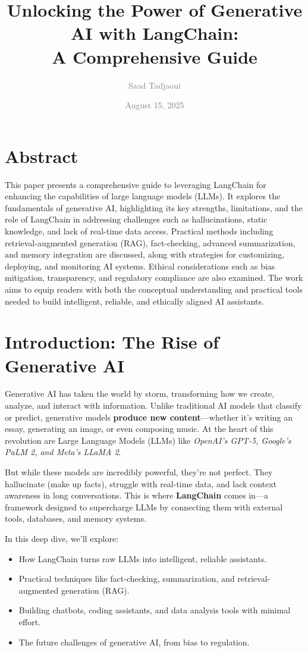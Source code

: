 \documentclass[12pt,a4paper]{article}
\title{\textcolor{mainblue}{\textbf{Unlocking the Power of Generative AI with LangChain: \\ A Comprehensive Guide}}}
\author{\textcolor{graytext}{Saad Tadjaoui}}
\date{\textcolor{graytext}{August 15, 2025}}
\begin{document}
\maketitle

\section*{Abstract}
\color{graytext}
This paper presents a comprehensive guide to leveraging LangChain for enhancing the capabilities of large language models (LLMs). It explores the fundamentals of generative AI, highlighting its key strengths, limitations, and the role of LangChain in addressing challenges such as hallucinations, static knowledge, and lack of real-time data access. Practical methods including retrieval-augmented generation (RAG), fact-checking, advanced summarization, and memory integration are discussed, along with strategies for customizing, deploying, and monitoring AI systems. Ethical considerations such as bias mitigation, transparency, and regulatory compliance are also examined. The work aims to equip readers with both the conceptual understanding and practical tools needed to build intelligent, reliable, and ethically aligned AI assistants.

\section*{Introduction: The Rise of Generative AI}
Generative AI has taken the world by storm, transforming how we create, analyze, and interact with information. Unlike traditional AI models that classify or predict, generative models \textbf{produce new content}—whether it's writing an essay, generating an image, or even composing music. At the heart of this revolution are Large Language Models (LLMs) like \textit{OpenAI's GPT-5, Google's PaLM 2, and Meta's LLaMA 2}.

But while these models are incredibly powerful, they're not perfect. They hallucinate (make up facts), struggle with real-time data, and lack context awareness in long conversations. This is where \textbf{LangChain} comes in—a framework designed to supercharge LLMs by connecting them with external tools, databases, and memory systems.

In this deep dive, we'll explore:
\begin{itemize}
    \item How LangChain turns raw LLMs into intelligent, reliable assistants.
    \item Practical techniques like fact-checking, summarization, and retrieval-augmented generation (RAG).
    \item Building chatbots, coding assistants, and data analysis tools with minimal effort.
    \item The future challenges of generative AI, from bias to regulation.
\end{itemize}
\end{document}
